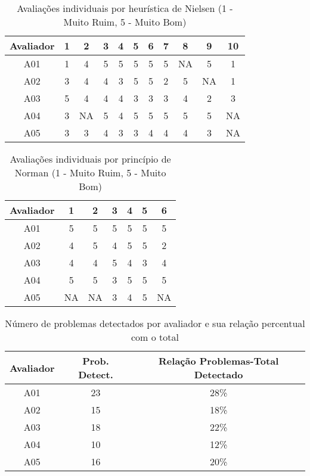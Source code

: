 \begin{table}[H]
    \centering
    \tiny
    \begin{tabular}{|c|c|c|c|c|c|c|c|c|c|c|}
        \hline
        \textbf{Avaliador} & \textbf{1} & \textbf{2} & \textbf{3} & \textbf{4} & \textbf{5} & \textbf{6} & \textbf{7} & \textbf{8} & \textbf{9} & \textbf{10} \\
        \hline
        A01 & 1 & 4 & 5 & 5 & 5 & 5 & 5 & NA & 5 & 1 \\
        \hline
        A02 & 3 & 4 & 4 & 3 & 5 & 5 & 2 & 5 & NA & 1 \\
        \hline
        A03 & 5 & 4 & 4 & 4 & 3 & 3 & 3 & 4 & 2 & 3 \\
        \hline
        A04 & 3 & NA & 5 & 4 & 5 & 5 & 5 & 5 & 5 & NA \\
        \hline
        A05 & 3 & 3 & 4 & 3 & 3 & 4 & 4 & 4 & 3 & NA \\
        \hline
    \end{tabular}
    \caption{Avaliações individuais por heurística de Nielsen (1 - Muito Ruim, 5 - Muito Bom)}
    \label{tab:avaliacoes-individuais-nielsen}
\end{table}

\begin{table}[H]
    \centering
    \tiny
    \begin{tabular}{|c|c|c|c|c|c|c|}
        \hline
        \textbf{Avaliador} & \textbf{1} & \textbf{2} & \textbf{3} & \textbf{4} & \textbf{5} & \textbf{6} \\
        \hline
        A01 & 5 & 5 & 5 & 5 & 5 & 5 \\
        \hline
        A02 & 4 & 5 & 4 & 5 & 5 & 2 \\
        \hline
        A03 & 4 & 4 & 5 & 4 & 3 & 4 \\
        \hline
        A04 & 5 & 5 & 3 & 5 & 5 & 5 \\
        \hline
        A05 & NA & NA & 3 & 4 & 5 & NA \\
        \hline
    \end{tabular}
    \caption{Avaliações individuais por princípio de Norman (1 - Muito Ruim, 5 - Muito Bom)}
    \label{tab:avaliacoes-individuais-norman}
\end{table}

\begin{table}[H]
    \centering
    \begin{tabular}{|c|c|c|}
        \hline
        \textbf{\tiny{Avaliador}} & \textbf{\tiny{Prob. Detect.}} & \textbf{\tiny{Relação Problemas-Total Detectado}} \\
        \hline
        A01 & 23 & 28\% \\
        \hline
        A02 & 15 & 18\% \\
        \hline
        A03 & 18 & 22\% \\
        \hline
        A04 & 10 & 12\% \\
        \hline
        A05 & 16 & 20\% \\
        \hline
    \end{tabular}
    \caption{Número de problemas detectados por avaliador e sua relação percentual com o total}
    \label{tab:problemas-avaliadores}
\end{table}
